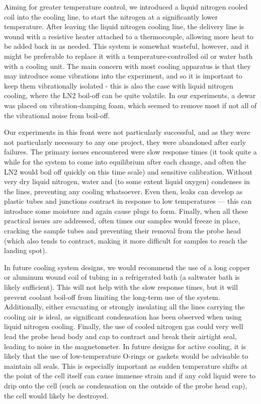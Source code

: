 \documentclass[PaulGanssle-Thesis.tex]{subfiles}
\begin{document}
Aiming for greater temperature control, we introduced a liquid nitrogen cooled coil into the cooling line, to start the nitrogen at a significantly lower temperature. After leaving the liquid nitrogen cooling line, the delivery line is wound with a resistive heater attached to a thermocouple, allowing more heat to be added back in as needed. This system is somewhat wasteful, however, and it might be preferable to replace it with a temperature-controlled oil or water bath with a cooling unit. The main concern with most cooling apparatus is that they may introduce some vibrations into the experiment, and so it is important to keep them vibrationally isolated - this is also the case with liquid nitrogen cooling, where the LN2 boil-off can be quite volatile. In our experiments, a dewar was placed on vibration-damping foam, which seemed to remove most if not all of the vibrational noise from boil-off.

Our experiments in this front were not particularly successful, and as they were not particularly necessary to any one project, they were abandoned after early failures. The primary issues encountered were slow response times (it took quite a while for the system to come into equilibrium after each change, and often the LN2 would boil off quickly on this time scale) and sensitive calibration. Without very dry liquid nitrogen, water and (to some extent liquid oxygen) condenses in the lines, preventing any cooling whatsoever. Even then, leaks can develop as plastic tubes and junctions contract in response to low temperatures --- this can introduce some moisture and again cause plugs to form. Finally, when all these practical issues are addressed, often times our samples would freeze in place, cracking the sample tubes and preventing their removal from the probe head (which also tends to contract, making it more difficult for samples to reach the landing spot).

In future cooling system designs, we would recommend the use of a long copper or aluminum wound coil of tubing in a refrigerated bath (a saltwater bath is likely sufficient). This will not help with the slow response times, but it will prevent coolant boil-off from limiting the long-term use of the system. Additionally, either evacuating or strongly insulating all the lines carrying the cooling air is ideal, as significant condensation has been observed when using liquid nitrogen cooling. Finally, the use of cooled nitrogen gas could very well lead the probe head body and cap to contract and break their airtight seal, leading to noise in the magnetometer. In future designs for active cooling, it is likely that the use of low-temperature O-rings or gaskets would be advisable to maintain all seals. This is especially important as sudden temperature shifts at the point of the cell itself can cause immense strain and if any cold liquid were to drip onto the cell (such as condensation on the outside of the probe head cap), the cell would likely be destroyed.
\end{document}
